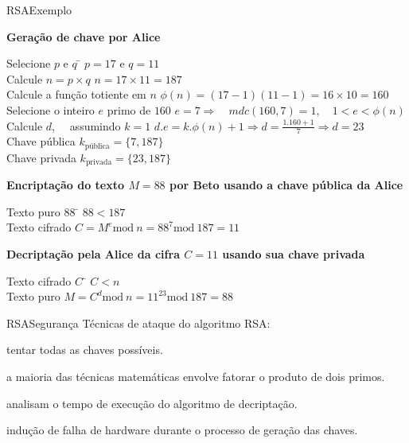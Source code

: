 \begin{frame}{RSA}{Exemplo}\footnotesize

  \hfil {\color{blue}\bf Geração de chave por Alice}
\begin{tabbing}
  Selecione $p$ e $q$ \hspace{3.3cm}\= $p=17$ e $q=11$\\
  Calcule $n=p\times q$ \> $n=17\times 11=187$\\
  Calcule a função totiente em $n$\> $\phi(n) = (17-1)(11-1)=16\times 10=160$\\
  Selecione o inteiro $e$ primo de $160$ \> $e=7\Rightarrow\quad mdc(160,7)=1,\quad 1<e<\phi(n)$\\
  Calcule $d$, {$\quad$\tiny assumindo $k=1$}  \> $ d.e = k.\phi(n) + 1  \Rightarrow d = \frac{1.160 + 1}{7} \Rightarrow d = 23 $\\
  Chave pública \> $k_{\text{pública}}=\{7,187\}$\\
  Chave privada \> $k_{\text{privada}}=\{23,187\}$\\
\end{tabbing}

\pause

 {\color{blue}\bf Encriptação do texto $M=88$ por Beto usando a chave pública da Alice}
\begin{tabbing}
  Texto puro $88$ \hspace{3.3cm}\= $88<187$\\
  Texto cifrado \> $C = M^e \text{mod}\ n = 88^7 \text{mod}\ 187 = 11$\\
\end{tabbing}

\pause

\hfil {\color{blue}\bf Decriptação pela Alice da cifra $C=11$ usando sua chave privada}
\begin{tabbing}
  Texto cifrado $C$ \hspace{3.3cm}\= $C<n$\\
  Texto puro \> $M = C^d \text{mod}\ n = 11^{23} \text{mod}\ 187 = 88$\\
\end{tabbing}
  
\end{frame}

\begin{frame}{RSA}{Segurança}\footnotesize
  Técnicas de ataque do algoritmo RSA:
  \begin{description}[<+->]
  \item[Força bruta:] tentar todas as chaves possíveis.
  \item[Matemático:] a maioria das técnicas matemáticas envolve 
    fatorar o produto de dois primos.
  \item[Temporização:] analisam o tempo de execução do algoritmo de 
    decriptação.
  \item[Baseados em falha de hardware:] indução de falha de hardware durante 
    o processo de geração das chaves.
  \end{description}
  
\end{frame}

